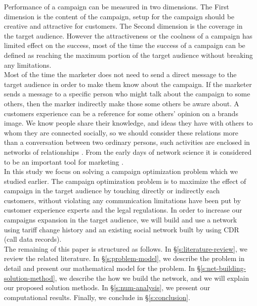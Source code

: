 \documentclass[11pt]{article}
\begin{document}
Performance of a campaign can be measured in two dimensions. The First dimension is the content of the campaign, setup for the campaign should be creative and attractive for customers. The Second dimension is the coverage in the target audience. However the attractiveness or the coolness of a campaign has limited effect on the success\citep{altshuler}, most of the time the success of a campaign can be defined as reaching the maximum portion of the target audience without breaking any limitations. \\

Most of the time the marketer does not need to send a direct message to the target audience in order to make them know about the campaign. If the marketer sends a message to a specific person who might talk about the campaign to some others, then the marker indirectly make those some others be aware about. A customers experience can be a reference for some others' opinion on a brands image. We know people share their knowledge, and ideas they have with others to whom they are connected socially, so we should consider these relations more than a conversation between two ordinary persons, such activities are enclosed in networks of relationships \citep{webster}. From the early days of network science it is considered to be an important tool for marketing \citep{arabie, webster}. \\

In this study we focus on solving a campaign optimization problem which we studied earlier. The campaign optimization problem is to maximize the effect of campaign in the target audience by touching directly or indirectly each customers, without violating any communication limitations have been put by customer experience experts and the legal regulations. In order to increase our campaigns expansion in the target audience, we will build and use a network using tariff change history and an existing social network built by using CDR (call data records).\\

The remaining of this paper is structured as follows. In \S \ref{s:literature-review}, we review the related literature. In \S \ref{s:problem-model}, we describe the problem in detail and present our mathematical model for the problem. In \S \ref{s:net-building-solution-method}, we describe the how we build the network, and we will explain our proposed solution methods. In \S \ref{s:num-analysis}, we present our computational results. Finally, we conclude in \S \ref{s:conclusion}.
\end{document}
